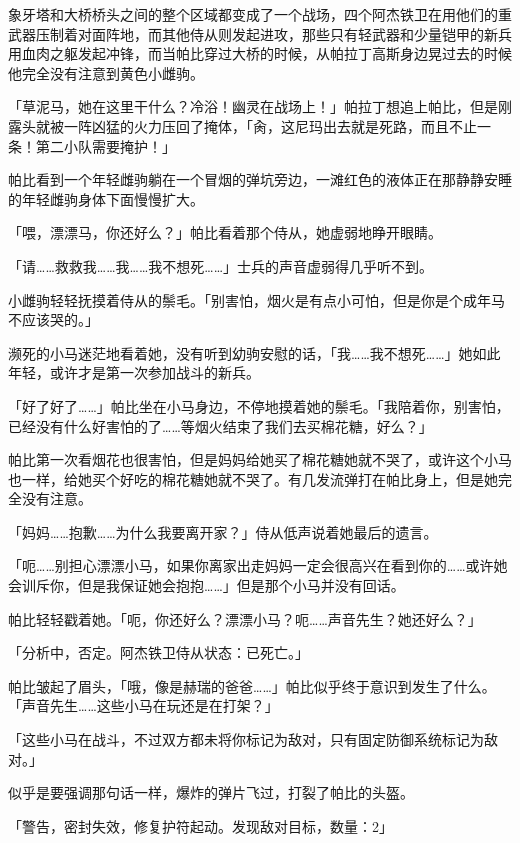 \horizonline


象牙塔和大桥桥头之间的整个区域都变成了一个战场，四个阿杰铁卫在用他们的重武器压制着对面阵地，而其他侍从则发起进攻，那些只有轻武器和少量铠甲的新兵用血肉之躯发起冲锋，而当帕比穿过大桥的时候，从帕拉丁高斯身边晃过去的时候他完全没有注意到黄色小雌驹。

「草泥马，她在这里干什么？冷浴！幽灵在战场上！」帕拉丁想追上帕比，但是刚露头就被一阵凶猛的火力压回了掩体，「肏，这尼玛出去就是死路，而且不止一条！第二小队需要掩护！」

帕比看到一个年轻雌驹躺在一个冒烟的弹坑旁边，一滩红色的液体正在那静静安睡的年轻雌驹身体下面慢慢扩大。

「喂，漂漂马，你还好么？」帕比看着那个侍从，她虚弱地睁开眼睛。

「请……救救我……我……我不想死……」士兵的声音虚弱得几乎听不到。

小雌驹轻轻抚摸着侍从的鬃毛。「别害怕，烟火是有点小可怕，但是你是个成年马不应该哭的。」

濒死的小马迷茫地看着她，没有听到幼驹安慰的话，「我……我不想死……」她如此年轻，或许才是第一次参加战斗的新兵。

「好了好了……」帕比坐在小马身边，不停地摸着她的鬃毛。「我陪着你，别害怕，已经没有什么好害怕的了……等烟火结束了我们去买棉花糖，好么？」

帕比第一次看烟花也很害怕，但是妈妈给她买了棉花糖她就不哭了，或许这个小马也一样，给她买个好吃的棉花糖她就不哭了。有几发流弹打在帕比身上，但是她完全没有注意。

「妈妈……抱歉……为什么我要离开家？」侍从低声说着她最后的遗言。

「呃……别担心漂漂小马，如果你离家出走妈妈一定会很高兴在看到你的……或许她会训斥你，但是我保证她会抱抱……」但是那个小马并没有回话。

帕比轻轻戳着她。「呃，你还好么？漂漂小马？呃……声音先生？她还好么？」

「{\mt 分析中，否定。阿杰铁卫侍从状态：已死亡。}」

帕比皱起了眉头，「哦，像是赫瑞的爸爸……」帕比似乎终于意识到发生了什么。「声音先生……这些小马在玩还是在打架？」

「{\mt 这些小马在战斗，不过双方都未将你标记为敌对，只有固定防御系统标记为敌对。}」

似乎是要强调那句话一样，爆炸的弹片飞过，打裂了帕比的头盔。

「{\mt 警告，密封失效，修复护符起动。发现敌对目标，数量：2}」

